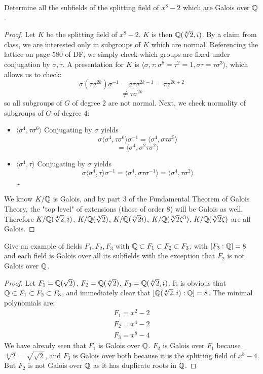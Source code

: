 \documentclass[num=11,duedate=04-21-21,course=Algebra\ II,proflastname=Walton]{hwtemplate}
\begin{document}
\problem[3]
\begin{claim} %
	Determine all the subfields of the splitting field of \(x^{8}-2\) which are Galois over \(\mathbb{Q}\).
\end{claim}
\begin{proof}
	
Let $K$ be the splitting field of $x^8-2$. $K$ is then $\mathbb{Q}(\sqrt[8]{2}, i)$. By a claim from class, we are interested only in subgroups of $K$ which are normal. Referencing the lattice on page 580 of DF, we simply check which groups are fixed under conjugation by $\sigma, \tau$. A presentation for $K$ is $\langle \sigma, \tau: \sigma^8=\tau^2=1, \sigma\tau=\tau\sigma^3\rangle$, which allows us to check:
$$\sigma(\tau\sigma^{2k})\sigma^{-1}=\sigma\tau\sigma^{2k-1} = \tau\sigma^{2k+2}$$
$$\neq \tau\sigma^{2k}$$
so all subgroups of $G$ of degree $2$ are not normal. Next, we check normality of subgroups of $G$ of degree 4:
\begin{itemize}
    \item $\langle \sigma^4, \tau\sigma^6\rangle$ Conjugating by $\sigma$ yields
    $$\sigma\langle\sigma^4,\tau\sigma^6\rangle\sigma^{-1} = \langle\sigma^4,\sigma\tau\sigma^5\rangle$$
    $$=\langle\sigma^4, \sigma^2\tau\sigma^2\rangle$$
    \item $\langle \sigma^4, \tau \rangle$ Conjugating by $\sigma$ yields $$\sigma\langle \sigma^4, \tau \rangle\sigma^{-1} = \langle \sigma^4, \sigma\tau\sigma^{-1} \rangle = \langle \sigma^4, \tau\sigma^2 \rangle$$
    \ldots
\end{itemize} 
We know $K/\mathbb{Q}$ is Galois, and by part 3 of the Fundamental Theorem of Galois Theory, the "top level" of extensions (those of order 8) will be Galois as well. Therefore $K/\mathbb{Q}(\sqrt[4]{2}, i)$, $K/\mathbb{Q}(\sqrt[8]{2})$, $K/\mathbb{Q}(\sqrt[8]{2}i)$, $K/\mathbb{Q}(\sqrt[8]{2}\zeta^3)$, $K/\mathbb{Q}(\sqrt[8]{2}\zeta)$ are all Galois.	
\end{proof}
\separator

\problem[4]
\begin{claim} %
	Give an example of fields \(F_1,F_2,F_3\) with \(\mathbb{Q}\subset F_1 \subset F_2\subset F_3\), with \([F_3 : \mathbb{Q}] = 8\) and each field is Galois over all its subfields with the exception that \(F_2\) is not Galois over \(\mathbb{Q}\).
\end{claim}
\begin{proof}
	Let $F_1 = \mathbb{Q}(\sqrt{2})$, $F_2 = \mathbb{Q}(\sqrt[4]{2})$, $F_3 = \mathbb{Q}(\sqrt[4]{2}, i)$. It is  obvious that \(\mathbb{Q}\subset F_1\subset F_2\subset F_3\), and immediately clear that \([\mathbb{Q}(\sqrt[4]{2},i):\mathbb{Q}] = 8 \). The minimal polynomials are:
	\begin{align*}
		F_1 = x^2-2\\
		F_2 = x^{4}-2\\
		F_3 = x^{8}-4
	\end{align*}
	We have already seen that \(F_1\) is Galois over \(\mathbb{Q}\). \(F_2\) is Galois over \(F_1\) because \(\sqrt[4]{2} = \sqrt{\sqrt{2} }  \), and \(F_3\) is Galois over both because it is the splitting field of \(x^{8}-4\). But \(F_2\) is not Galois over \(\mathbb{Q}\) as it has duplicate roots in \(\mathbb{Q}\).
\end{proof}
\end{document}
